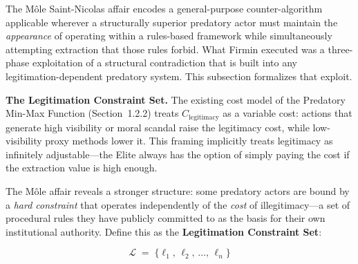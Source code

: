 The Môle Saint-Nicolas affair encodes a general-purpose counter-algorithm applicable wherever a structurally superior predatory actor must maintain the \textit{appearance} of operating within a rules-based framework while simultaneously attempting extraction that those rules forbid. What Firmin executed was a three-phase exploitation of a structural contradiction that is built into any legitimation-dependent predatory system. This subsection formalizes that exploit.

\textbf{The Legitimation Constraint Set.} The existing cost model of the Predatory Min-Max Function (Section~1.2.2) treats $C_{\text{legitimacy}}$ as a variable cost: actions that generate high visibility or moral scandal raise the legitimacy cost, while low-visibility proxy methods lower it. This framing implicitly treats legitimacy as infinitely adjustable---the Elite always has the option of simply paying the cost if the extraction value is high enough.

The M\^{o}le affair reveals a stronger structure: some predatory actors are bound by a \textit{hard constraint} that operates independently of the \textit{cost} of illegitimacy---a set of procedural rules they have publicly committed to as the basis for their own institutional authority. Define this as the \textbf{Legitimation Constraint Set}:

\begin{equation}\label{eq:13.5-legitimation-constraint-set}
\mathcal{L} \;=\; \{\ell_1,\, \ell_2,\, \ldots,\, \ell_n\}
\end{equation}


